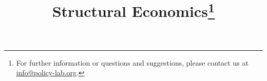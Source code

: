 	
\title{Structural Economics\thanks{For further information or questions and suggestions, please contact us at \href{mailto: info@policy-lab.org}{info@policy-lab.org}.}}
\author{ }\date{ }




\grid
